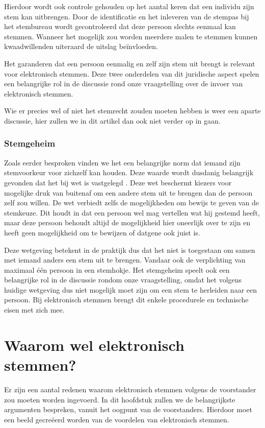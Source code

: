 \documentclass[a4paper]{article}
\begin{document}
Hierdoor wordt ook controle gehouden op het aantal keren dat een individu zijn stem kan uitbrengen.
Door de identificatie en het inleveren van de stempas bij het stembureau wordt gecontroleerd dat deze persoon slechts eenmaal kan stemmen.
Wanneer het mogelijk zou worden meerdere malen te stemmen kunnen kwaadwillenden uiteraard de uitslag beïnvloeden.

Het garanderen dat een persoon eenmalig en zelf zijn stem uit brengt is relevant voor elektronisch stemmen. 
Deze twee onderdelen van dit juridische aspect spelen een belangrijke rol in de discussie rond onze vraagstelling over de invoer van elektronisch stemmen.

Wie er precies wel of niet het stemrecht zouden moeten hebben is weer een aparte discussie, hier zullen we in dit artikel dan ook niet verder op in gaan.

\subsubsection{Stemgeheim}
Zoals eerder besproken vinden we het een belangrijke norm dat iemand zijn stemvoorkeur voor zichzelf kan houden.
Deze waarde wordt dusdanig belangrijk gevonden dat het bij wet is vastgelegd \cite{wetboek}.
Deze wet beschermt kiezers voor mogelijke druk van buitenaf om een andere stem uit te brengen dan de persoon zelf zou willen.
De wet verbiedt zelfs de mogelijkheden om bewijs te geven van de stemkeuze.
Dit houdt in dat een persoon wel mag vertellen wat hij gestemd heeft, maar deze persoon behoudt altijd de mogelijkheid hier oneerlijk over te zijn en heeft geen mogelijkheid om te bewijzen of datgene ook juist is.

Deze wetgeving betekent in de praktijk dus dat het niet is toegestaan om samen met iemand anders een stem uit te brengen.
Vandaar ook de verplichting van maximaal {\'e}{\'e}n persoon in een stemhokje.
Het stemgeheim speelt ook een belangrijke rol in de discussie rondom onze vraagstelling, omdat het volgens huidige wetgeving dus niet mogelijk moet zijn om een stem te herleiden naar een persoon.
Bij elektronisch stemmen brengt dit enkele procedurele en technische eisen met zich mee.

\newpage

\section{Waarom wel elektronisch stemmen?}
\label{text:voor}
Er zijn een aantal redenen waarom elektronisch stemmen volgens de voorstander zou moeten worden ingevoerd.
In dit hoofdstuk zullen we de belangrijkste argumenten bespreken, vanuit het oogpunt van de voorstanders.
Hierdoor moet een beeld gecre{\"e}erd worden van de voordelen van elektronisch stemmen.
\end{document}
